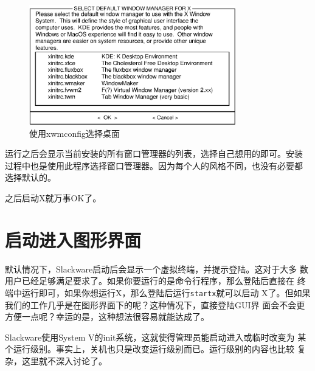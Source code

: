 \begin{figure}[htpb]
  \centering
  \includegraphics[width=0.8\textwidth]{images/installation/setup-xwmconfig.eps}
  \caption{使用xwmconfig选择桌面}
  \label{fig:selectX-xwmconfig}
\end{figure}

运行之后会显示当前安装的所有窗口管理器的列表，选择自己想用的即可。安装
过程中也是使用此程序选择窗口管理器。因为每个人的风格不同，也没有必要都
选择默认的。

之后启动X就万事OK了。

\section{启动进入图形界面}
\label{chap:xconfiguration:bootInX}
默认情况下，Slackware启动后会显示一个虚拟终端，并提示登陆。这对于大多
数用户已经足够满足要求了。如果你要运行的是命令行程序，那么登陆后直接在
终端中运行即可，如果你想运行X，那么登陆后运行\texttt{startx}就可以启动
X了。但如果我们的工作几乎是在图形界面下的呢？这种情况下，直接登陆GUI界
面会不会更方便一点呢？幸运的是，这种想法很容易就能达成了。

Slackware使用System V的init系统，这就使得管理员能启动进入或临时改变为
某个运行级别。事实上，关机也只是改变运行级别而已。运行级别的内容也比较
复杂，这里就不深入讨论了。

